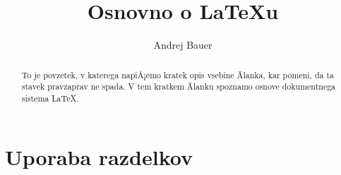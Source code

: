 \documentclass[a4paper]{article}
\begin{document}

\title{Osnovno o {\LaTeX}u}
\author{Andrej Bauer}


\maketitle


\begin{abstract}
  To je povzetek, v katerega napiÅ¡emo kratek opis vsebine Älanka, kar pomeni, da ta stavek
  pravzaprav ne spada. V tem kratkem Älanku spoznamo osnove dokumentnega sistema {\LaTeX}.
\end{abstract}


\section{Uporaba razdelkov}

\end{document}
